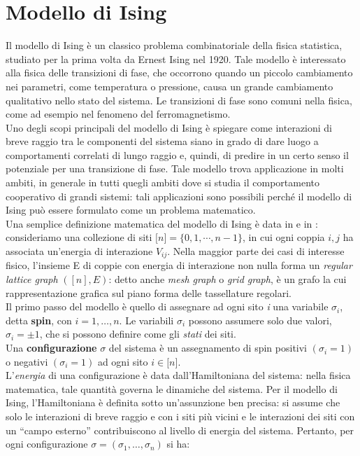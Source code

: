 \section{Modello di Ising}\label{sec:ising}
Il modello di Ising è un classico problema combinatoriale della fisica statistica, studiato per la prima volta da Ernest Ising nel 1920. Tale modello è interessato alla fisica delle transizioni di fase, che occorrono quando un piccolo cambiamento nei parametri, come temperatura o pressione, causa un grande cambiamento qualitativo nello stato del sistema. Le transizioni di fase sono comuni nella fisica, come ad esempio nel fenomeno del ferromagnetismo.\\
Uno degli scopi principali del modello di Ising è spiegare come interazioni di breve raggio tra le componenti del sistema siano in grado di dare luogo a comportamenti correlati di lungo raggio e, quindi, di predire in un certo senso il potenziale per una transizione di fase. Tale modello trova applicazione in molti ambiti, in generale in tutti quegli ambiti dove si studia il comportamento cooperativo di grandi sistemi: tali applicazioni sono possibili perché il modello di Ising può essere formulato come un problema matematico.\\
Una semplice definizione matematica del modello di Ising è data in \cite{cipra1987introduction} e in \cite{jerrum1993polynomial}: consideriamo una collezione di siti $\lbrack n \rbrack = \lbrace 0, 1, \cdots, n-1 \rbrace$, in cui ogni coppia $i, j$ ha associata un’energia di interazione $V_{ij}$. Nella maggior parte dei casi di interesse fisico, l’insieme E di coppie con energia di interazione non nulla forma un \textit{regular lattice graph} $([n], E)$: detto anche \textit{mesh graph} o \textit{grid graph}, è un grafo la cui rappresentazione grafica sul piano forma delle tassellature regolari.\\
Il primo passo del modello è quello di assegnare ad ogni sito \textit{i} una variabile $\sigma_i$, detta \textbf{spin}, con $i=1, \dots, n$. Le variabili $\sigma_i$ possono assumere solo due valori, $\sigma_i = \pm 1$, che si possono definire come gli \textit{stati} dei siti.\\
Una \textbf{configurazione} $\sigma$ del sistema è un assegnamento di spin positivi $\left( \sigma_i = 1 \right)$ o negativi $\left( \sigma_i = 1 \right)$ ad ogni sito $i \in \lbrack n \rbrack$.\\
L'\textit{energia} di una configurazione è data dall’Hamiltoniana del sistema: nella fisica matematica, tale quantità governa le dinamiche del sistema. Per il modello di Ising, l’Hamiltoniana è definita sotto un’assunzione ben precisa: si assume che solo le interazioni di breve raggio e con i siti più vicini e le interazioni dei siti con un ``campo esterno'' contribuiscono al livello di energia del sistema. Pertanto, per ogni configurazione $\sigma = (\sigma_1, \dots, \sigma_n)$ si ha:\\
